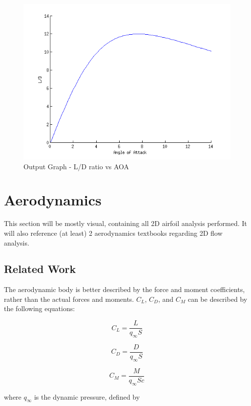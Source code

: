 \documentclass[]{article}
\begin{document}
\begin{figure}[H]
\centering
\includegraphics[scale=.75]{ldaoaexample}
\caption{Output Graph - L/D ratio vs AOA}
\end{figure}


\section{Aerodynamics}
This section will be mostly visual, containing all 2D airfoil analysis performed.  It will also reference (at least) 2 aerodynamics textbooks regarding 2D flow analysis.  

\subsection{Related Work}
The aerodynamic body is better described by the force and moment coefficients, rather than the actual forces and moments.  $C_{L}$, $C_{D}$, and $C_{M}$ can be described by the following equations:

\begin{equation}
C_{L} = \frac{L}{q_{\infty} S}
\end{equation}

\begin{equation}
C_{D} = \frac{D}{q_{\infty} S}
\end{equation}

\begin{equation}
C_{M} = \frac{M}{q_{\infty} Sc}
\end{equation}

where $q_{\infty}$ is the dynamic pressure, defined by
\end{document}
